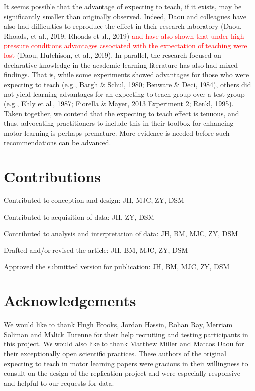 \documentclass[
  english,
  man,floatsintext]{apa7}
\begin{document}
It seems possible that the advantage of expecting to teach, if it exists, may be significantly smaller than originally observed. Indeed, Daou and colleagues have also had difficulties to reproduce the effect in their research laboratory (Daou, Rhoads, et al., 2019; Rhoads et al., 2019) \textcolor{red}{and have also shown that under high pressure conditions advantages associated with the expectation of teaching were lost} (Daou, Hutchison, et al., 2019). In parallel, the research focused on declarative knowledge in the academic learning literature has also had mixed findings. That is, while some experiments showed advantages for those who were expecting to teach (e.g., Bargh \& Schul, 1980; Benware \& Deci, 1984), others did not yield learning advantages for an expecting to teach group over a test group (e.g., Ehly et al., 1987; Fiorella \& Mayer, 2013 Experiment 2; Renkl, 1995). Taken together, we contend that the expecting to teach effect is tenuous, and thus, advocating practitioners to include this in their toolbox for enhancing motor learning is perhaps premature. More evidence is needed before such recommendations can be advanced.

\hypertarget{contributions}{%
\section{Contributions}\label{contributions}}

\noindent Contributed to conception and design: JH, MJC, ZY, DSM

\noindent Contributed to acquisition of data: JH, ZY, DSM

\noindent Contributed to analysis and interpretation of data: JH, BM, MJC, ZY, DSM

\noindent Drafted and/or revised the article: JH, BM, MJC, ZY, DSM

\noindent Approved the submitted version for publication: JH, BM, MJC, ZY, DSM

\hypertarget{acknowledgements}{%
\section{Acknowledgements}\label{acknowledgements}}

We would like to thank Hugh Brooks, Jordan Hassin, Rohan Ray, Merriam Soliman and Malick Turenne for their help recruiting and testing participants in this project. We would also like to thank Matthew Miller and Marcos Daou for their exceptionally open scientific practices. These authors of the original expecting to teach in motor learning papers were gracious in their willingness to consult on the design of the replication project and were especially responsive and helpful to our requests for data.
\end{document}
